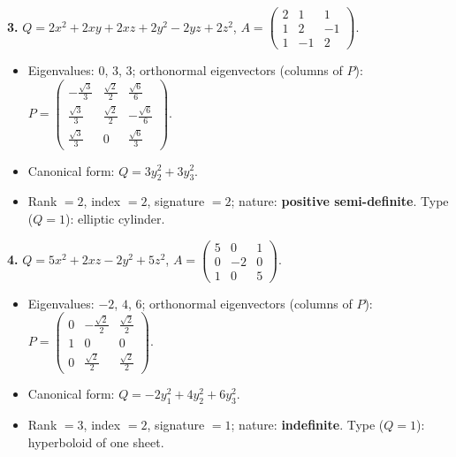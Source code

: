 \noindent\textbf{3.} $Q=2 x^{2} + 2 x y + 2 x z + 2 y^{2} - 2 y z + 2 z^{2}$, $A=\begin{pmatrix}2 & 1 & 1 \\ 1 & 2 & -1 \\ 1 & -1 & 2\end{pmatrix}$.
\begin{itemize}\item Eigenvalues: $0$, $3$, $3$; orthonormal eigenvectors (columns of $P$): $P=\begin{pmatrix}- \frac{\sqrt{3}}{3} & \frac{\sqrt{2}}{2} & \frac{\sqrt{6}}{6} \\ \frac{\sqrt{3}}{3} & \frac{\sqrt{2}}{2} & - \frac{\sqrt{6}}{6} \\ \frac{\sqrt{3}}{3} & 0 & \frac{\sqrt{6}}{3}\end{pmatrix}$.
\item Canonical form: $Q=3 y_{2}^{2} + 3 y_{3}^{2}$.
\item Rank $=2$, index $=2$, signature $=2$; nature: \textbf{positive semi-definite}. Type ($Q=1$): elliptic cylinder.\end{itemize}

\noindent\textbf{4.} $Q=5 x^{2} + 2 x z - 2 y^{2} + 5 z^{2}$, $A=\begin{pmatrix}5 & 0 & 1 \\ 0 & -2 & 0 \\ 1 & 0 & 5\end{pmatrix}$.
\begin{itemize}\item Eigenvalues: $-2$, $4$, $6$; orthonormal eigenvectors (columns of $P$): $P=\begin{pmatrix}0 & - \frac{\sqrt{2}}{2} & \frac{\sqrt{2}}{2} \\ 1 & 0 & 0 \\ 0 & \frac{\sqrt{2}}{2} & \frac{\sqrt{2}}{2}\end{pmatrix}$.
\item Canonical form: $Q=- 2 y_{1}^{2} + 4 y_{2}^{2} + 6 y_{3}^{2}$.
\item Rank $=3$, index $=2$, signature $=1$; nature: \textbf{indefinite}. Type ($Q=1$): hyperboloid of one sheet.\end{itemize}

